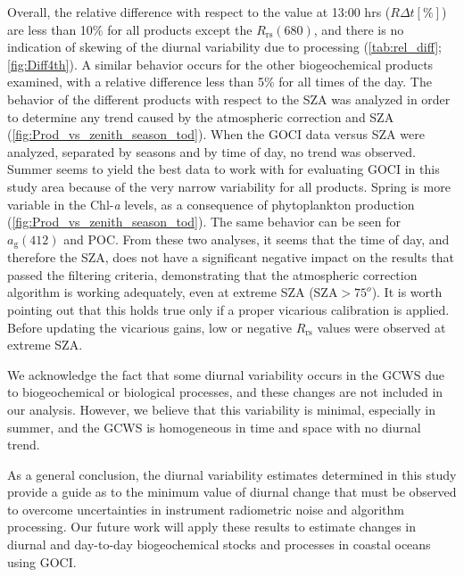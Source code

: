 \documentclass[remotesensing,article,submit,moreauthors,pdftex,10pt,a4paper]{Definitions/mdpi}
\begin{document}
Overall, the relative difference with respect to the value at 13:00 hrs ($R\Delta t[\%]$) are less than 10\% for all products except the $R_\text{rs}(680)$, and there is no indication of skewing of the diurnal variability due to processing (\autoref{tab:rel_diff}; \autoref{fig:Diff4th}). A similar behavior occurs for the other biogeochemical products examined, with a relative difference less than 5\% for all times of the day. The behavior of the different products with respect to the SZA was analyzed in order to determine any trend caused by the atmospheric correction and SZA (\autoref{fig:Prod_vs_zenith_season_tod}). When the GOCI data versus SZA were analyzed, separated by seasons and by time of day, no trend was observed. Summer seems to yield the best data to work with for evaluating GOCI in this study area because of the very narrow variability for all products. Spring is more variable in the Chl-{\it a} levels, as a consequence of phytoplankton production (\autoref{fig:Prod_vs_zenith_season_tod}). The same behavior can be seen for $a_\text{g}(412)$ and POC. From these two analyses, it seems that the time of day, and therefore the SZA, does not have a significant negative impact on the results that passed the filtering criteria, demonstrating that the atmospheric correction algorithm is working adequately, even at extreme SZA (SZA$>75^o$). It is worth pointing out that this holds true only if a proper vicarious calibration is applied. Before updating the vicarious gains, low or negative $R_\text{rs}$ values were observed at extreme SZA.

We acknowledge the fact that some diurnal variability occurs in the GCWS due to biogeochemical or biological processes, and these changes are not included in our analysis. However, we believe that this variability is minimal, especially in summer, and the GCWS is homogeneous in time and space with no diurnal trend. 

As a general conclusion, the diurnal variability estimates determined in this study provide a guide as to the minimum value of diurnal change that must be  observed to overcome uncertainties in instrument radiometric noise and algorithm processing. Our future work will apply these results to estimate changes in diurnal and day-to-day biogeochemical stocks and processes in coastal oceans using GOCI. 

\vspace{6pt} 

\end{document}
